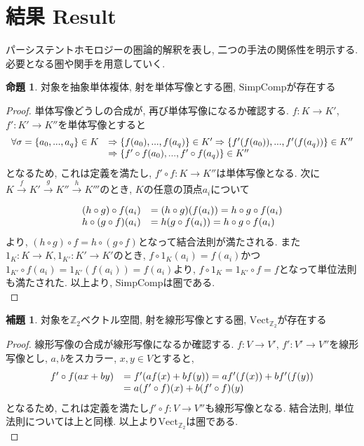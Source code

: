 \documentclass[a4paper]{jsarticle}
\theoremstyle{definition}
\newtheorem{prop}[dfn]{命題}
\newtheorem{lem}[dfn]{補題}
\newcommand{\SimpComp}{{\mathrm{SimpComp}}}
\newcommand{\Vect}{{\mathrm{Vect}}}
\begin{document}
\section{結果 Result}
パーシステントホモロジーの圏論的解釈を表し, 二つの手法の関係性を明示する. 必要となる圏や関手を用意していく.
\begin{prop}
    対象を抽象単体複体, 射を単体写像とする圏, $\SimpComp$が存在する
\end{prop}
\begin{proof}
    単体写像どうしの合成が, 再び単体写像になるか確認する. $f:K\rightarrow K'$, $f':K'\rightarrow K''$を単体写像とすると
{\large
\begin{equation}
    \begin{array}{ll}
        \forall\sigma =\{a_0,...,a_q\}\in K & \Rightarrow \{f(a_0),...,f(a_q)\}\in K'\Rightarrow\{f'(f(a_0)),...,f'(f(a_q))\}\in K'' \\
         &  \Rightarrow\{f'\circ f(a_0),...,f'\circ f(a_q)\}\in K''\notag
    \end{array}
\end{equation}
}
となるため, これは定義を満たし, $f'\circ f:K\rightarrow K''$は単体写像となる. 次に$K\xrightarrow[]{f} K'\xrightarrow[]{g} K''\xrightarrow[]{h}K'''$のとき, $K$の任意の頂点$a_i$について
\begin{equation}
    \begin{array}{ll}
        (h\circ g)\circ f(a_i) & =(h\circ g)(f(a_i))=h\circ g\circ f(a_i) \\
        h\circ (g\circ f)(a_i) & =h(g\circ f(a_i))=h\circ g\circ f(a_i)\notag
    \end{array}
\end{equation}
より, $(h\circ g)\circ f=h\circ (g\circ f)$となって結合法則が満たされる. また$1_K:K\rightarrow K, 1_{K'}:K'\rightarrow K'$のとき, $f\circ 1_K(a_i)=f(a_i)$かつ$1_{K'}\circ f(a_i)=1_{K'}(f(a_i))=f(a_i)$より, $f\circ 1_K=1_{K'}\circ f=f$となって単位法則も満たされた. 以上より, SimpCompは圏である.\\
\end{proof}


\begin{lem}
    対象を$\mathbb{Z}_2$ベクトル空間, 射を線形写像とする圏, $\Vect_{\mathbb{Z}_2}$が存在する
\end{lem}
\begin{proof}
    線形写像の合成が線形写像になるか確認する. $f:V\rightarrow V'$, $f':V'\rightarrow V''$を線形写像とし, $a, b$をスカラー, $x, y\in V$とすると, 
\begin{equation}
    \begin{array}{ll}
        f'\circ f(ax+by) & =f'(af(x)+bf(y))=af'(f(x))+bf'(f(y)) \\
         & =a(f'\circ f)(x)+b(f'\circ f)(y)\notag
    \end{array}
\end{equation}
となるため, これは定義を満たし$f'\circ f:V\rightarrow V''$も線形写像となる. 結合法則, 単位法則については上と同様. 以上より$\Vect_{\mathbb{Z}_2}$は圏である.\\
\end{proof}
\end{document}
